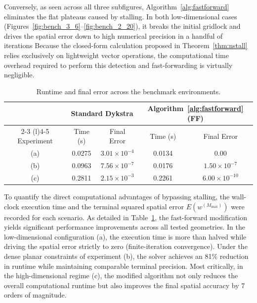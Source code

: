 Conversely, as seen across all three subfigures, Algorithm~\ref{alg:fastforward} eliminates the flat plateaus caused by stalling. In both low-dimensional cases (Figures~\ref{fig:bench_3_6}--\ref{fig:bench_2_20}), it breaks the initial gridlock and drives the spatial error down to high numerical precision in a handful of iterations Because the closed-form calculation proposed in Theorem~\ref{thm:nstall} relies exclusively on lightweight vector operations, the computational time overhead required to perform this detection and fast-forwarding is virtually negligible.

\begin{table}[htbp]
    \centering
    \caption{Runtime and final error across the benchmark environments.}
    \label{tab:benchmark_runtime}
    \begin{tabular}{@{}ccccc@{}}
        \toprule
        & \multicolumn{2}{c}{Standard Dykstra} & \multicolumn{2}{c}{Algorithm~\ref{alg:fastforward} (FF)} \\
        \cmidrule(lr){2-3} \cmidrule(l){4-5}
        Experiment & Time (s) & Final Error & Time (s) & Final Error \\
        \midrule
        (a) & 0.0275 & $3.01 \times 10^{-4}$ & 0.0134 & $0.00$ \\
        (b) & 0.0963 & $7.56 \times 10^{-7}$ & 0.0176 & $1.50 \times 10^{-7}$ \\
        (c) & 0.2811 & $2.15 \times 10^{-3}$ & 0.2261 & $6.00 \times 10^{-10}$ \\
        \bottomrule
    \end{tabular}
\end{table}

To quantify the direct computational advantages of bypassing stalling, the wall-clock execution time and the terminal squared spatial error $E(w^{(M_{\max})})$ were recorded for each scenario. As detailed in Table~\ref{tab:benchmark_runtime}, the fast-forward modification yields significant performance improvements across all tested geometries. In the low-dimensional configuration (a), the execution time is more than halved while driving the spatial error strictly to zero (finite-iteration convergence). Under the dense planar constraints of experiment (b), the solver achieves an 81\% reduction in runtime while maintaining comparable terminal precision. Most critically, in the high-dimensional regime (c), the modified algorithm not only reduces the overall computational runtime but also improves the final spatial accuracy by 7 orders of magnitude.